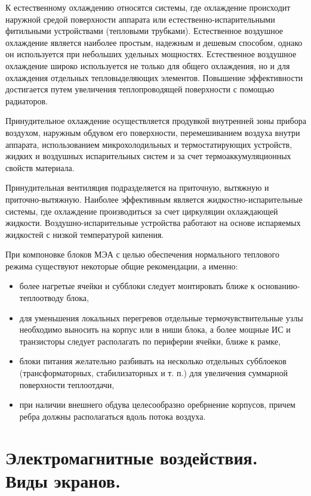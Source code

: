 \documentclass[unicode, 12pt, a4paper, oneside]{article}
\begin{document}
К естественному охлаждению относятся системы, где охлаждение происходит наружной средой поверхности аппарата или естественно-испарительными фитильными устройствами (тепловыми трубками). Естественное воздушное охлаждение является наиболее простым, надежным и дешевым способом, однако он используется при небольших удельных мощностях.  Естественное воздушное охлаждение широко используется не только для общего охлаждения, но и для охлаждения отдельных тепловыделяющих элементов. Повышение эффективности достигается путем увеличения теплопроводящей поверхности с помощью радиаторов.

Принудительное охлаждение осуществляется продувкой внутренней зоны прибора воздухом, наружным обдувом его поверхности, перемешиванием воздуха внутри аппарата, использованием микрохолодильных и термостатирующих устройств, жидких и воздушных испарительных систем и за счет термоаккумуляционных свойств материала.

 Принудительная вентиляция подразделяется на приточную, вытяжную и приточно-вытяжную. Наиболее эффективным является жидкостно-испарительные системы, где охлаждение производиться за счет циркуляции охлаждающей жидкости. Воздушно-испарительные устройства работают на основе испаряемых жидкостей с низкой температурой кипения.
 
При компоновке блоков МЭА с целью обеспечения нормального теплового режима существуют некоторые общие рекомендации, а именно:
\begin{itemize}
\item более нагретые ячейки и субблоки следует монтировать ближе к основанию-теплоотводу блока,
\item для уменьшения локальных перегревов отдельные термочувствительные узлы необходимо выносить на корпус или в ниши блока, а более мощные ИС и транзисторы следует располагать по периферии ячейки, ближе к рамке, 
\item блоки питания желательно разбивать на несколько отдельных субблоеков (трансформаторных, стабилизаторных и т. п.) для увеличения суммарной поверхности теплоотдачи,
\item при наличии внешнего обдува целесообразно оребрнение корпусов, причем ребра должны располагаться вдоль потока воздуха.
\end{itemize}


\section{Электромагнитные воздействия. Виды экранов.}
\end{document}
